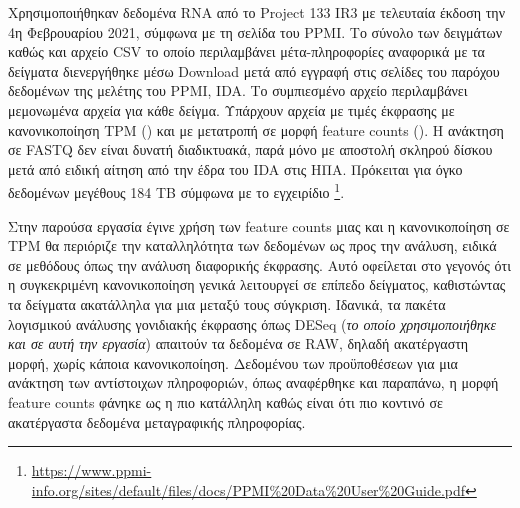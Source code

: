 \documentclass[12pt]{report}
\makeatletter
\let\oldchapter\chapter
\renewcommand{\chapter}{\@ifstar{\starchapter}{\nostarchapter}}
\newcommand{\starchapter}[1]{\oldchapter*{#1}\thispagestyle{mainstyle}}
\newcommand{\nostarchapter}[1]{\oldchapter{#1}\thispagestyle{mainstyle}}
\let\oldfootnote\footnote
\renewcommand{\footnote}[1]{\oldfootnote{\onehalfspacing #1}}
\makeatother
\begin{document}
    \chapter{Εισαγωγή}
    \par
        Χρησιμοποιήθηκαν δεδομένα RNA από το Project 133 IR3 με τελευταία έκδοση την 4η Φεβρουαρίου 2021, σύμφωνα με τη σελίδα του PPMI. Το σύνολο των δειγμάτων καθώς και αρχείο CSV το οποίο περιλαμβάνει μέτα-πληροφορίες αναφορικά με τα δείγματα διενεργήθηκε μέσω Download μετά από εγγραφή στις σελίδες του παρόχου δεδομένων της μελέτης του PPMI, IDA. Το συμπιεσμένο αρχείο περιλαμβάνει μεμονωμένα αρχεία για κάθε δείγμα. Υπάρχουν αρχεία με τιμές έκφρασης με κανονικοποίηση TPM (\emph{\cite{Zhao2021TPMRepository}}) και με μετατροπή σε μορφή feature counts (\emph{\cite{Liao2014FeatureCounts:Features}}). Η ανάκτηση σε FASTQ  δεν είναι δυνατή διαδικτυακά, παρά μόνο με αποστολή σκληρού δίσκου μετά από ειδική αίτηση από την έδρα του IDA στις ΗΠΑ. Πρόκειται για όγκο δεδομένων μεγέθους 184 TB σύμφωνα με το εγχειρίδιο \footnote{\url{https://www.ppmi-info.org/sites/default/files/docs/PPMI\%20Data\%20User\%20Guide.pdf}}.
    \par
        Στην παρούσα εργασία έγινε χρήση των feature counts μιας και η κανονικοποίηση σε TPM θα περιόριζε την καταλληλότητα των δεδομένων ως προς την ανάλυση, ειδικά σε μεθόδους όπως την ανάλυση διαφορικής έκφρασης. Αυτό οφείλεται στο γεγονός ότι η συγκεκριμένη κανονικοποίηση γενικά λειτουργεί σε επίπεδο δείγματος, καθιστώντας τα δείγματα ακατάλληλα για μια μεταξύ τους σύγκριση. Ιδανικά, τα πακέτα λογισμικού ανάλυσης γονιδιακής έκφρασης όπως DESeq (\emph{το οποίο χρησιμοποιήθηκε και σε αυτή την εργασία}) απαιτούν τα δεδομένα σε RAW, δηλαδή ακατέργαστη μορφή, χωρίς κάποια κανονικοποίηση. Δεδομένου των προϋποθέσεων για μια ανάκτηση των αντίστοιχων πληροφοριών, όπως αναφέρθηκε και παραπάνω, η μορφή feature counts φάνηκε ως η πιο κατάλληλη καθώς είναι ότι πιο κοντινό σε ακατέργαστα δεδομένα μεταγραφικής πληροφορίας.
        
\end{document}
